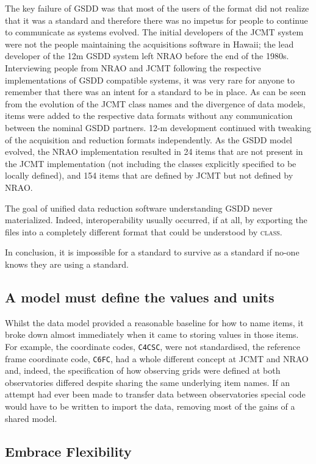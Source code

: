 \documentclass[final,authoryear,5p,times,twocolumn]{elsarticle}
\begin{document}
The key failure of GSDD was that most of the users of the format did
not realize that it was a standard and therefore there was no
impetus for people to continue to communicate as systems
evolved. The initial developers of the JCMT system were not the people
maintaining the acquisitions software in Hawaii; the lead developer of
the 12m GSDD system left NRAO before the end of the 1980s.
Interviewing people from NRAO and JCMT following the
respective implementations of GSDD compatible systems, it was very rare
for anyone to remember that there was an intent for a standard to be
in place. As can be seen from the evolution of the JCMT class names
and the divergence of data models, items were added to the respective
data formats without any communication between the nominal GSDD
partners. 12-m development continued with tweaking of the acquisition
and reduction formats independently.  As the GSDD model evolved, the
NRAO implementation resulted in 24 items that are not present in the
JCMT implementation (not including the classes explicitly specified to
be locally defined), and 154 items that are defined by JCMT but not
defined by NRAO.

The goal of unified data reduction software understanding GSDD never
materialized. Indeed, interoperability usually occurred, if at all, by exporting
the files into a completely different format that could be understood
by \textsc{class}.

In conclusion, it is impossible for a standard to survive as a standard
if no-one knows they are using a standard.

\subsection{A model must define the values and units}

Whilst the data model provided a reasonable baseline for how to name
items, it broke down almost immediately when it came to storing values
in those items. For example, the coordinate codes, \texttt{C4CSC},
were not standardised, the reference frame coordinate code,
\texttt{C6FC}, had a whole different concept at JCMT and NRAO and,
indeed, the specification of how observing grids were defined at both
observatories differed despite sharing the same underlying item
names. If an attempt had ever been made to transfer data between
observatories special code would have to be written to import the
data, removing most of the gains of a shared model.

\subsection{Embrace Flexibility}
\end{document}
